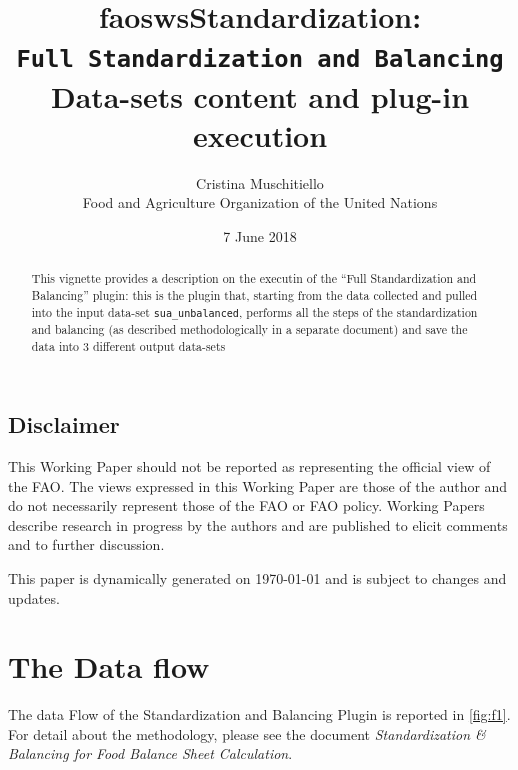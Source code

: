 \documentclass[]{article}
\title{faoswsStandardization:\\
\texttt{Full\ Standardization\ and\ Balancing}\\
Data-sets content and plug-in execution}
\author{Cristina Muschitiello\\
Food and Agriculture Organization of the United Nations}
\date{7 June 2018}
\begin{document}
\maketitle
\begin{abstract}
This vignette provides a description on the executin of the ``Full
Standardization and Balancing'' plugin: this is the plugin that,
starting from the data collected and pulled into the input data-set
\texttt{sua\_unbalanced}, performs all the steps of the standardization
and balancing (as described methodologically in a separate document) and
save the data into 3 different output data-sets
\end{abstract}

{
\setcounter{tocdepth}{4}
\tableofcontents
}
\listoffigures

\subsection*{Disclaimer}\label{disclaimer}

This Working Paper should not be reported as representing the official
view of the FAO. The views expressed in this Working Paper are those of
the author and do not necessarily represent those of the FAO or FAO
policy. Working Papers describe research in progress by the authors and
are published to elicit comments and to further discussion.

This paper is dynamically generated on \today{} and is subject to
changes and updates.

\newpage

\section*{The Data flow}\label{the-data-flow}

The data Flow of the Standardization and Balancing Plugin is reported in
\ref{fig:f1}. For detail about the methodology, please see the document
\emph{Standardization \& Balancing for Food Balance Sheet Calculation}.
\end{document}
